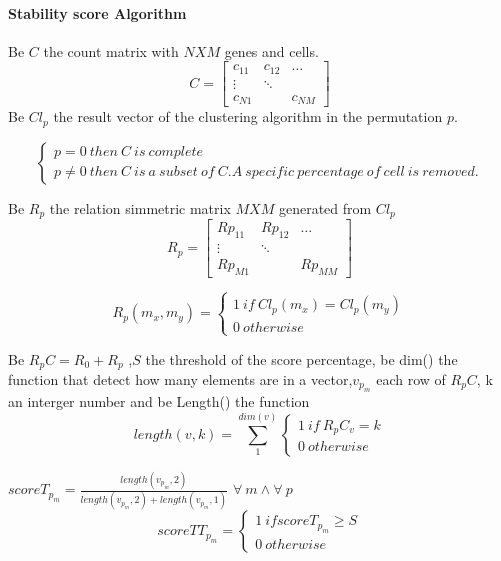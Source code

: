 \documentclass[12pt]{article}
\begin{document}
\paragraph{Stability score Algorithm}
Be $C$ the count matrix with $NXM$ genes and cells.
\[
C = \begin{bmatrix} 
    c_{11} & c_{12} & \dots \\
    \vdots & \ddots & \\
    c_{N1} &        & c_{NM} 
    \end{bmatrix}
\]
Be $Cl_p$ the result vector of the clustering algorithm in the permutation $p$.



 \[
   \left\{
                \begin{array}{ll}
                  p = 0 \ then \ C \ is \ complete\\
                  p \neq 0 \ then \ C \ is \ a \ subset \ of \ C. A \ specific\ percentage\ of\ cell\ is\ removed. 
                \end{array}
              \right.
  \]
  
 Be $R_p$ the relation simmetric matrix $MXM$ generated from $Cl_p$   
\[
R_p = \begin{bmatrix} 
    Rp_{11} & Rp_{12} & \dots \\
    \vdots & \ddots & \\
    Rp_{M1} &        & Rp_{MM} 
    \end{bmatrix}
\]

 \[
   R_p(m_x,m_y)=\left\{
                \begin{array}{ll}
                 1 \ if \ Cl_p(m_x)=Cl_p(m_y)\\
                 0 \ otherwise 
                \end{array}
              \right.
  \]

Be $R_pC = R_0 + R_p$ ,$S$ the threshold of the score percentage, be dim() the function that detect how many elements are in a vector,$v_{p_m}$ each row of $R_pC$, k an interger number and be Length() the function 
 \[
   length(v,k)=\sum\limits_{1}^{dim(v)}\left\{
                \begin{array}{ll}
                 1 \ if \ R_pC_{v} = k\\
                 0 \ otherwise 
                \end{array}
              \right.
  \]
  
  $ scoreT_{p_m}= \frac{ length(v_{p_m},2)}{length(v_{p_m},2)+length(v_{p_m},1)}$ 
$\forall \ m  \land \forall \ p $
 \[
   scoreTT_{p_m}=\left\{
                \begin{array}{ll}
                 1 \ if scoreT_{p_m} \geq S \\
                 0 \ otherwise 
                \end{array}
              \right.
  \]
  
\end{document}
